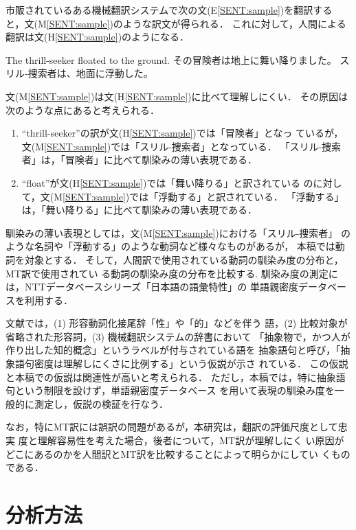 市販されているある機械翻訳システムで次の文(E\ref{SENT:sample})を翻訳する
と，文(M\ref{SENT:sample})のような訳文が得られる．
これに対して，人間による翻訳は文(H\ref{SENT:sample})のようになる．
\begin{SENT2}
\sentE The thrill-seeker floated to the ground.
\sentH その冒険者は地上に舞い降りました。
\sentM スリル‐捜索者は、地面に浮動した。
\label{SENT:sample}
\end{SENT2}
文(M\ref{SENT:sample})は文(H\ref{SENT:sample})に比べて理解しにくい．
その原因は次のような点にあると考えられる．
\begin{enumerate}
\item ``thrill-seeker''の訳が文(H\ref{SENT:sample})では「冒険者」となっ
ているが，文(M\ref{SENT:sample})では「スリル-捜索者」となっている．
「スリル-捜索者」は，「冒険者」に比べて馴染みの薄い表現である．
\item ``float''が文(H\ref{SENT:sample})では「舞い降りる」と訳されている
のに対して，文(M\ref{SENT:sample})では「浮動する」と訳されている．
「浮動する」は，「舞い降りる」に比べて馴染みの薄い表現である．
\end{enumerate}
馴染みの薄い表現としては，文(M\ref{SENT:sample})における「スリル-捜索者」
のような名詞や「浮動する」のような動詞など様々なものがあるが，
本稿では動詞を対象とする．
そして，人間訳で使用されている動詞の馴染み度の分布と，MT訳で使用されてい
る動詞の馴染み度の分布を比較する.
馴染み度の測定には，NTTデータベースシリーズ「日本語の語彙特性」の
単語親密度データベース\cite{Amano99}を利用する．

文献\cite{Takahashi91}では，(1) 形容動詞化接尾辞「性」や「的」などを伴う
語，(2) 比較対象が省略された形容詞，(3) 機械翻訳システムの辞書において
「抽象物で，かつ人が作り出した知的概念」というラベルが付与されている語を
抽象語句と呼び，「抽象語句密度は理解しにくさに比例する」という仮説が示さ
れている．
この仮説と本稿での仮説は関連性が高いと考えられる．
ただし，本稿では，特に抽象語句という制限を設けず，単語親密度データベース
を用いて表現の馴染み度を一般的に測定し，仮説の検証を行なう．

なお，特にMT訳には誤訳の問題があるが，本研究は，翻訳の評価尺度として忠実
度と理解容易性\cite{Nagao85}を考えた場合，後者について，MT訳が理解しにく
い原因がどこにあるのかを人間訳とMT訳を比較することによって明らかにしてい
くものである．

\section{分析方法}
\label{sec:method}

